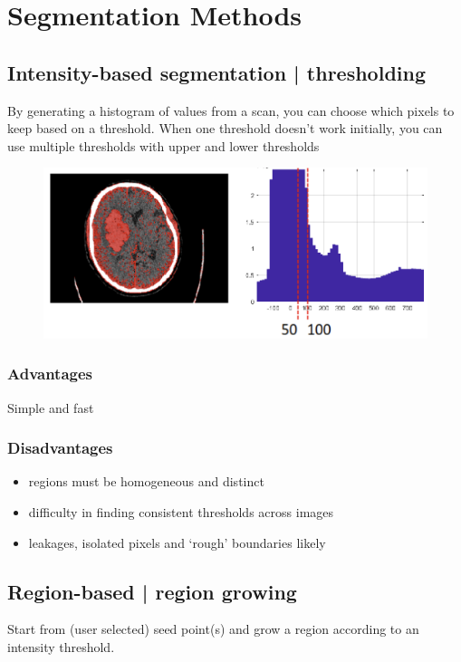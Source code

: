 \documentclass[11pt]{article}
\begin{document}
\section{Segmentation Methods}

\subsection{Intensity-based segmentation | thresholding}

By generating a histogram of values from a scan, you can choose which pixels to keep based on a threshold. When one threshold doesn't work initially, you can use multiple thresholds with upper and lower thresholds

\begin{figure}[H]
    \centering
    \includegraphics[width=.6\linewidth]{figures/ul-thresholding.png}
\end{figure}

\subsubsection{Advantages}

Simple and fast

\subsubsection{Disadvantages}

\begin{itemize}
    \item regions must be homogeneous and distinct
    \item difficulty in finding consistent thresholds across images
    \item leakages, isolated pixels and `rough' boundaries likely
\end{itemize}

\subsection{Region-based | region growing}

Start from (user selected) seed point(s) and grow a region according to an intensity threshold.
\end{document}
